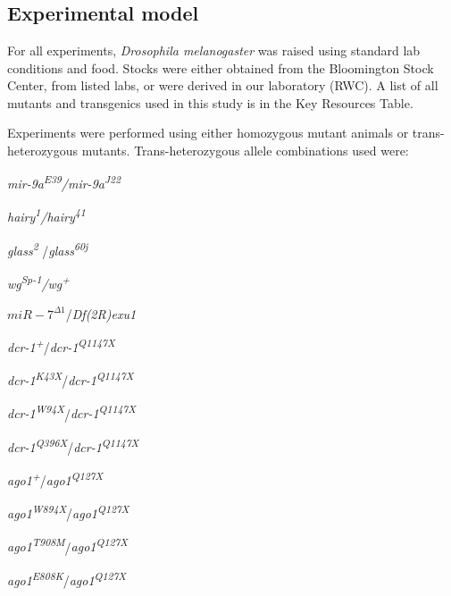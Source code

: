 \graphicspath{ {./figures/metabolism/} }

\section{}
\label{appendix:methods:metabolism}


\subsection{Experimental model}
\label{appendix:methods:metabolism:experimental_model}

For all experiments, \textit{Drosophila melanogaster} was raised using standard lab conditions and food. Stocks were either obtained from the Bloomington Stock Center, from listed labs, or were derived in our laboratory (RWC). A list of all mutants and transgenics used in this study is in the Key Resources Table.

Experiments were performed using either homozygous mutant animals or trans-heterozygous mutants. Trans-heterozygous allele combinations used were:

\textit{mir-9a\textsuperscript{E39}/mir-9a\textsuperscript{J22}}

\textit{hairy\textsuperscript{1}/hairy\textsuperscript{41}}

\textit{glass\textsuperscript{2 }}/\textit{glass\textsuperscript{60j}}

\textit{wg\textsuperscript{Sp-1}/wg\textsuperscript{+}}

$miR-7^{\Delta 1}$/\textit{Df(2R)exu1}

\textit{dcr-1\textsuperscript{+}}/\textit{dcr-1\textsuperscript{Q1147X}}

\textit{dcr-1\textsuperscript{K43X}}/\textit{dcr-1\textsuperscript{Q1147X}}

\textit{dcr-1\textsuperscript{W94X}}/\textit{dcr-1\textsuperscript{Q1147X}}

\textit{dcr-1\textsuperscript{Q396X}}/\textit{dcr-1\textsuperscript{Q1147X}}

\textit{ago1\textsuperscript{+}}/\textit{ago1\textsuperscript{Q127X}}

\textit{ago1\textsuperscript{W894X}}/\textit{ago1\textsuperscript{Q127X}}

\textit{ago1\textsuperscript{T908M}}/\textit{ago1\textsuperscript{Q127X}}

\textit{ago1\textsuperscript{E808K}}/\textit{ago1\textsuperscript{Q127X}}

